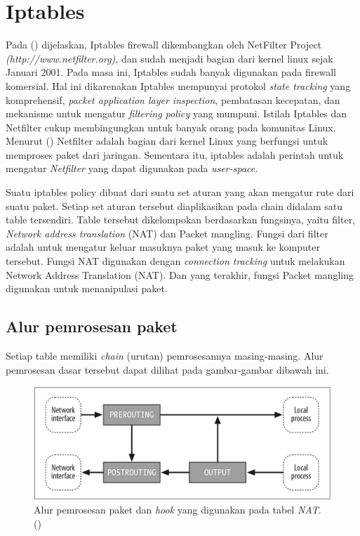 \section{Iptables}
Pada (\cite{rash2007linux}) dijelaskan, Iptables firewall dikembangkan oleh NetFilter Project \textit{(http://www.netfilter.org)}, dan sudah menjadi bagian dari kernel linux sejak Januari 2001.  Pada masa ini, Iptables sudah banyak digunakan pada firewall komersial. Hal ini dikarenakan Iptables mempunyai protokol \textit{state tracking} yang komprehensif, \textit{packet application layer inspection}, pembatasan kecepatan, dan mekanisme untuk mengatur \textit{filtering policy} yang mumpuni. 
Istilah Iptables dan Netfilter cukup membingungkan untuk banyak orang pada komunitas Linux. Menurut (\cite{purdy2004linux}) Netfilter adalah bagian dari kernel Linux yang berfungsi untuk memproses paket dari jaringan. Sementara itu,  iptables adalah perintah untuk mengatur \textit{Netfilter} yang dapat digunakan pada \textit{user-space}. 

Suatu iptables policy dibuat dari suatu set aturan yang akan mengatur rute dari suatu paket. Setiap set aturan tersebut diaplikasikan pada chain didalam satu table tersendiri. Table tersebut dikelompokan berdasarkan fungsinya, yaitu filter, \textit{Network address translation} (NAT) dan Packet mangling. Fungsi dari filter adalah untuk mengatur keluar masuknya paket yang masuk ke komputer tersebut. Fungsi NAT digunakan dengan \textit{connection tracking} untuk melakukan Network Address Translation (NAT). Dan yang terakhir, fungsi Packet mangling digunakan untuk menanipulasi paket.

\subsection{Alur pemrosesan paket}
Setiap table memiliki \textit{chain} (urutan) pemrosesannya masing-masing. Alur pemrosesan dasar tersebut dapat dilihat pada gambar-gambar dibawah ini.
\begin{figure}[H]
	\centering
	\includegraphics[width=\textwidth]{resources/nat_table.png}
	\caption{Alur pemrosesan paket dan \textit{hook} yang digunakan pada tabel \textit{NAT}. (\cite{purdy2004linux})}
	\label{fig:packetflow_NAT}
\end{figure}

